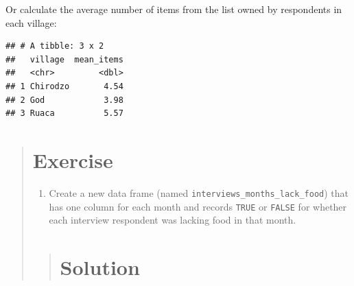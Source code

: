 \documentclass[]{book}
\newenvironment{Shaded}{\begin{snugshade}}{\end{snugshade}}
\newcommand{\KeywordTok}[1]{\textcolor[rgb]{0.13,0.29,0.53}{\textbf{#1}}}
\newcommand{\DataTypeTok}[1]{\textcolor[rgb]{0.13,0.29,0.53}{#1}}
\newcommand{\StringTok}[1]{\textcolor[rgb]{0.31,0.60,0.02}{#1}}
\newcommand{\OtherTok}[1]{\textcolor[rgb]{0.56,0.35,0.01}{#1}}
\newcommand{\OperatorTok}[1]{\textcolor[rgb]{0.81,0.36,0.00}{\textbf{#1}}}
\newcommand{\NormalTok}[1]{#1}
\providecommand{\tightlist}{%
  \setlength{\itemsep}{0pt}\setlength{\parskip}{0pt}}
\begin{document}
Or calculate the average number of items from the list owned by
respondents in each village:

\begin{Shaded}
\end{Shaded}

\begin{verbatim}
## # A tibble: 3 x 2
##   village  mean_items
##   <chr>         <dbl>
## 1 Chirodzo       4.54
## 2 God            3.98
## 3 Ruaca          5.57
\end{verbatim}

\begin{quote}
\section{Exercise}\label{exercise-10}

\begin{enumerate}
\def\labelenumi{\arabic{enumi}.}
\tightlist
\item
  Create a new data frame (named
  \texttt{interviews\_months\_lack\_food}) that has one column for each
  month and records \texttt{TRUE} or \texttt{FALSE} for whether each
  interview respondent was lacking food in that month.
\end{enumerate}

\begin{quote}
\section{Solution}\label{solution-11}

\begin{Shaded}
\end{Shaded}
\end{quote}
\end{quote}
\end{document}
